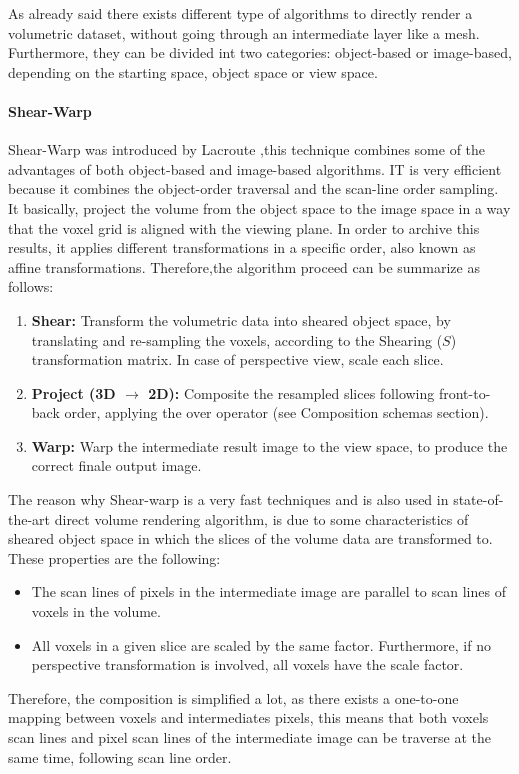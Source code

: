 \documentclass[10pt,a4paper]{article}
\begin{document}
As already said there exists different type of algorithms to directly render a volumetric dataset, without going through an intermediate layer like a mesh.
Furthermore, they can be divided int two categories: object-based or image-based, depending on the starting space, object space or view space.

\paragraph{Shear-Warp} Shear-Warp was introduced by Lacroute %
,this technique combines some of the advantages of both object-based and image-based algorithms. IT is very efficient because it combines the object-order traversal and the scan-line order sampling.
It basically, project the volume from the object space to the image space in a way that the voxel grid is aligned with the viewing plane.
In order to archive this results, it applies different transformations in a specific order, also known as affine transformations.
Therefore,the algorithm proceed can be summarize as follows:
\begin{enumerate}
\item \textbf{Shear:} Transform the volumetric data into sheared object space, by translating and re-sampling the voxels, according to the Shearing ($S$) transformation matrix. In case of perspective view, scale each slice.
\item \textbf{Project (3D $\rightarrow$ 2D):} Composite the resampled slices following front-to-back order, applying the over operator (see Composition schemas section).
\item \textbf{Warp:} Warp the intermediate result image to the view space, to produce the correct finale output image.
\end{enumerate} %

The reason why Shear-warp is a very fast techniques and is also used in state-of-the-art direct volume rendering algorithm, is due to some characteristics of sheared object space in which the slices of the volume data are transformed to.
These properties are the following:
\begin{itemize}
\item The scan lines %
of pixels in the intermediate image are parallel to scan lines of voxels in the volume.
\item All voxels in a given slice are scaled by the same factor. Furthermore, if no perspective transformation is involved, all voxels have the scale factor.
\end{itemize}
Therefore, the composition is simplified a lot, as there exists a one-to-one mapping between voxels and intermediates pixels, this means that both voxels scan lines and pixel scan lines of the intermediate image can be traverse at the same time, following scan line order.
\end{document}
